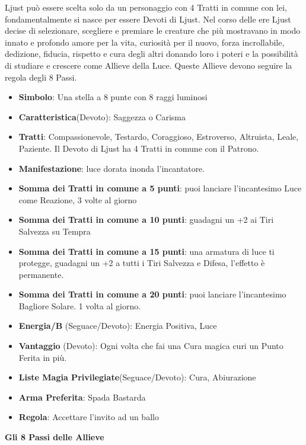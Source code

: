 \begin{multicols}{2}
Ljust può essere scelta solo da un personaggio con 4 Tratti in comune con lei, fondamentalmente si nasce per essere Devoti di Ljust. Nel corso delle ere Ljust decise di selezionare, scegliere e premiare le creature che più mostravano in modo innato e profondo amore per la vita, curiosità per il nuovo, forza incrollabile, dedizione, fiducia, rispetto e cura degli altri donando loro i poteri e la possibilità di studiare e crescere come Allieve della Luce. Queste Allieve devono seguire la regola degli 8 Passi.

\begin{itemize}[leftmargin=*] \setlength{\itemsep}{0pt}
\item \textbf{Simbolo}: Una stella a 8 punte con 8 raggi luminosi
\item \textbf{Caratteristica}(Devoto): Saggezza o Carisma
\item \textbf{Tratti}: Compassionevole, Testardo, Coraggioso, Estroverso, Altruista, Leale, Paziente. Il Devoto di Ljust ha 4 Tratti in comune con il Patrono.
\item \textbf{Manifestazione}: luce dorata inonda l'incantatore.
\item \textbf{Somma dei Tratti in comune a 5 punti}: puoi lanciare l'incantesimo Luce come Reazione, 3 volte al giorno
\item \textbf{Somma dei Tratti in comune a 10 punti}: guadagni un +2 ai Tiri Salvezza su Tempra
\item \textbf{Somma dei Tratti in comune a 15 punti}: una armatura di luce ti protegge, guadagni un +2 a tutti i Tiri Salvezza e Difesa, l'effetto è permanente.
\item \textbf{Somma dei Tratti in comune a 20 punti}: puoi lanciare l'incantesimo Bagliore Solare. 1 volta al giorno.
\item \textbf{Energia/B} (Seguace/Devoto): Energia Positiva, Luce
\item \textbf{Vantaggio} (Devoto): Ogni volta che fai una Cura magica curi un Punto Ferita in più.
\item \textbf{Liste Magia Privilegiate}(Seguace/Devoto): Cura, Abiurazione
\item \textbf{Arma Preferita}: Spada Bastarda
\item \textbf{Regola}: Accettare l'invito ad un ballo
\end{itemize}

\medskip

\textbf{Gli 8 Passi delle Allieve}


\end{multicols}
